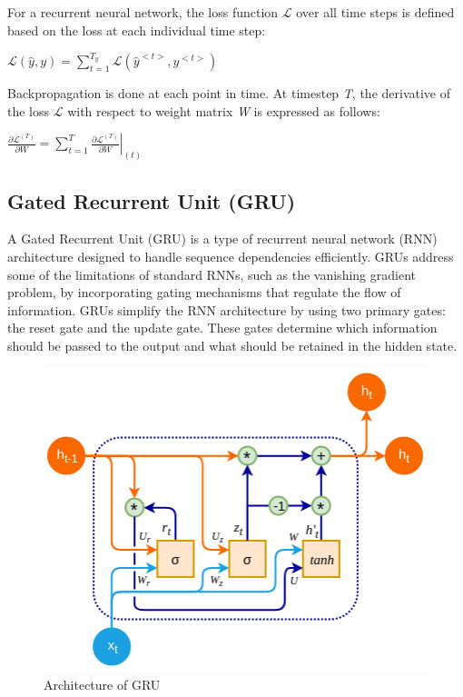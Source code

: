 \documentclass{ieeeojies}
\begin{document}
For a recurrent neural network, the loss function $\mathcal{L}$ over all time steps is defined based on the loss at each individual time step:
\newline \centerline{$\mathcal{L}(\hat{y},y) = \displaystyle \sum_{t=1}^{T_{y}}\mathcal{L}(\hat{y}^{<t>},y^{<t>})$}
Backpropagation is done at each point in time. At timestep \textit{T}, the derivative of the loss $\mathcal{L}$ with respect to weight matrix \textit{W} is expressed as follows:
\newline \centerline{$\displaystyle \frac{\partial \mathcal{L}^{(T)}}{\partial W} = \displaystyle \sum_{t=1}^{T} \left. \frac{\partial \mathcal{L}^{(T)}}{\partial W} \right|_{(t)}$}
\subsection{Gated Recurrent Unit (GRU)}
A Gated Recurrent Unit (GRU) is a type of recurrent neural network (RNN) architecture designed to handle sequence dependencies efficiently. GRUs address some of the limitations of standard RNNs, such as the vanishing gradient problem, by incorporating gating mechanisms that regulate the flow of information. GRUs simplify the RNN architecture by using two primary gates: the reset gate and the update gate. These gates determine which information should be passed to the output and what should be retained in the hidden state.
\begin{figure}[H]
	\centering
	\begin{minipage}{0.25\textwidth}
		\centering
		\includegraphics[width=1\textwidth]{bibliography/Images/GRU_Img1.png}
		\caption{Architecture of GRU}
		\label{fig:1}
	\end{minipage}
\end{figure}
\end{document}
